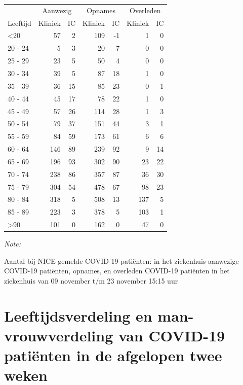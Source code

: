 \documentclass[
  english,
  man,floatsintext]{apa6}
\begin{document}
\begin{table}
\centering\begingroup\fontsize{10}{12}\selectfont

\begin{threeparttable}
\begin{tabular}{lrrrrrr}
\toprule
\multicolumn{1}{c}{ } & \multicolumn{2}{c}{Aanwezig} & \multicolumn{2}{c}{Opnames} & \multicolumn{2}{c}{Overleden} \\
\cmidrule(l{3pt}r{3pt}){2-3} \cmidrule(l{3pt}r{3pt}){4-5} \cmidrule(l{3pt}r{3pt}){6-7}
Leeftijd & Kliniek & IC & Kliniek & IC & Kliniek & IC\\
\midrule
<20 & 57 & 2 & 109 & -1 & 1 & 0\\
20 - 24 & 5 & 3 & 20 & 7 & 0 & 0\\
25 - 29 & 23 & 5 & 50 & 4 & 0 & 0\\
30 - 34 & 39 & 5 & 87 & 18 & 1 & 0\\
35 - 39 & 36 & 15 & 85 & 23 & 0 & 1\\
40 - 44 & 45 & 17 & 78 & 22 & 1 & 0\\
45 - 49 & 57 & 26 & 114 & 28 & 1 & 3\\
50 - 54 & 79 & 37 & 151 & 44 & 3 & 1\\
55 - 59 & 84 & 59 & 173 & 61 & 6 & 6\\
60 - 64 & 146 & 89 & 239 & 92 & 9 & 14\\
65 - 69 & 196 & 93 & 302 & 90 & 23 & 22\\
70 - 74 & 238 & 86 & 357 & 87 & 36 & 30\\
75 - 79 & 304 & 54 & 478 & 67 & 98 & 23\\
80 - 84 & 318 & 5 & 508 & 13 & 137 & 5\\
85 - 89 & 223 & 3 & 378 & 5 & 103 & 1\\
>90 & 101 & 0 & 162 & 0 & 47 & 0\\
\bottomrule
\end{tabular}
\begin{tablenotes}
\item \textit{Note: } 
\item Aantal bij NICE gemelde COVID-19 patiënten: in het ziekenhuis aanwezige COVID-19 patiënten, opnames, en overleden COVID-19 patiënten in het ziekenhuis van 09 november t/m 23 november 15:15 uur
\end{tablenotes}
\end{threeparttable}
\endgroup{}
\end{table}

\newpage

\hypertarget{leeftijdsverdeling-en-man-vrouwverdeling-van-covid-19-patiuxebnten-in-de-afgelopen-twee-weken}{%
\section{Leeftijdsverdeling en man-vrouwverdeling van COVID-19 patiënten in de afgelopen twee weken}\label{leeftijdsverdeling-en-man-vrouwverdeling-van-covid-19-patiuxebnten-in-de-afgelopen-twee-weken}}
\end{document}
